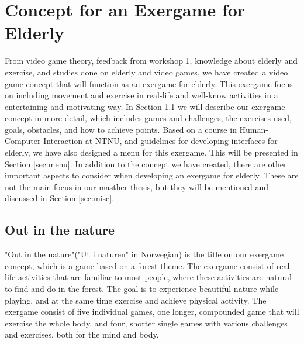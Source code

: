\chapter{Concept for an Exergame for Elderly}
From video game theory, feedback from workshop 1, knowledge about elderly and exercise, and studies done on elderly and video games, we have created a video game concept that will function as an exergame for elderly. This exergame focus on including movement and exercise in real-life and well-know activities in a entertaining and motivating way. In Section \ref{sec:outinthenature} we will describe our exergame concept in more detail, which includes games and challenges, the exercises used, goals, obstacles, and how to achieve points. Based on a course in Human-Computer Interaction at NTNU, and guidelines for developing interfaces for elderly, we have also designed a menu for this exergame. This will be presented in Section \ref{sec:menu}. In addition to the concept we have created, there are other important aspects to consider when developing an exergame for elderly. These are not the main focus in our masther thesis, but they will be mentioned and discussed in Section \ref{sec:misc}.

\section{Out in the nature}
\label{sec:outinthenature}

"Out in the nature"("Ut i naturen" in Norwegian) is the title on our exergame concept, which is a game based on a forest theme. The exergame consist of real-life activities that are familiar to most people, where these activities are natural to find and do in the forest. The goal is to experience beautiful nature while playing, and at the same time exercise and achieve physical activity. The exergame consist of five individual games, one longer, compounded game that will exercise the whole body, and four, shorter single games with various challenges and exercises, both for the mind and body. 

